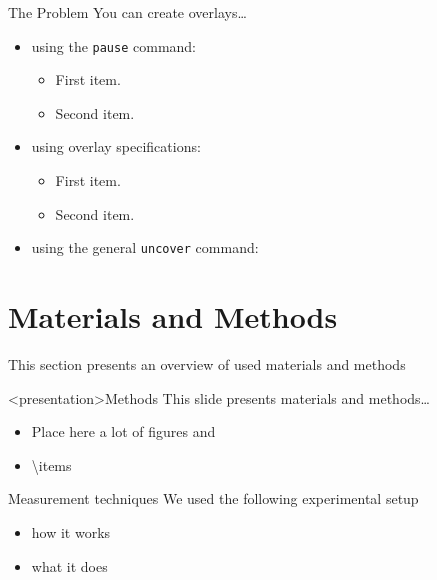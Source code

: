   \begin{frame}{The Problem}
    You can create overlays\dots
    \begin{itemize}
    \item using the \texttt{pause} command:
      \begin{itemize}
      \item
        First item.
        \pause
      \item    
        Second item.
      \end{itemize}
    \item
      using overlay specifications:
      \begin{itemize}
      \item<3->
        First item.
      \item<4->
        Second item.
      \end{itemize}
    \item
      using the general \texttt{uncover} command:
      \begin{itemize}
      \end{itemize}
    \end{itemize}
  \end{frame}


\section{Materials and Methods}
  This section presents an overview of used materials and methods
  \begin{frame}<presentation>{Methods}
    This slide presents materials and methods\ldots
    \begin{itemize}
      \item Place here a lot of figures and
      \item \textbackslash{}items
    \end{itemize}
  \end{frame}

  \begin{frame}{Measurement techniques}
    We used the following experimental setup
    \begin{itemize}
      \item how it works
      \item what it does
    \end{itemize}
  \end{frame}

